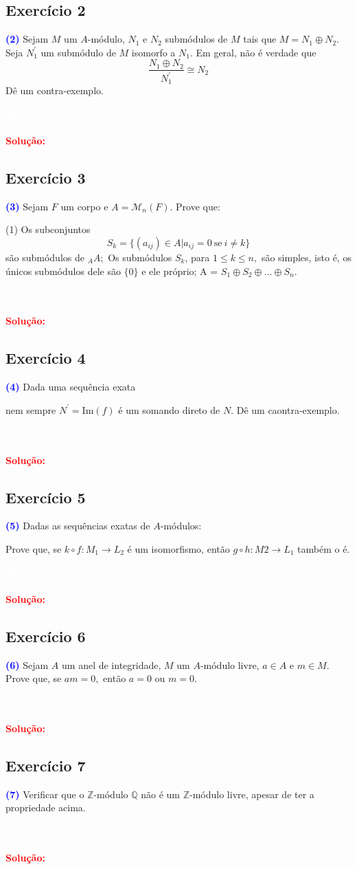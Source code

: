 \documentclass[11pt,a4paper]{article}
\newcommand{\exercicio}[1]{\subsection{Exercício #1} \textcolor{blue}{\bf(#1)}}
\newcommand{\dividiritens}[1]{\begin{tasks}[counter-format={(tsk[a])},label-width=3.6ex, label-format = {\bfseries}, column-sep = {0pt}](1) #1 \end{tasks}}
\newcommand{\pers}[1]{\textcolor{Floresta}{$\negrito{(#1)} $}}
\newcommand{\solucao}[1]{
\textbf{\textcolor{white}{oi}\\ \\ \textcolor{red}{Solução:}} #1}
\begin{document}
\exercicio{2} Sejam $M$ um $A$-módulo, $N_1$ e $N_2$ submódulos de $M$ tais que $M = N_1 \oplus N_2.$ Seja $N^\prime_1$ um submódulo de $M$ isomorfo a $N_1.$ Em geral, não é verdade que
\[
\frac{N_1 \oplus N_2}{N_1^{\prime}} \cong N_2
\]
Dê um contra-exemplo.
\solucao{}

\exercicio{3} Sejam $F$ um corpo e $A = \mathcal{M}_n(F).$ Prove que:
\dividiritens{
\task[\pers{a}] Os subconjuntos
\[
S_k = \{ (a_{ij}) \in A | a_{ij} = 0 \ \mbox{se} \ i \neq k \}
\]
são submódulos de ${}_AA;$
\task[\pers{b}] Os submódulos $S_k$, para $1 \le k \le n,$ são simples, isto é, os únicos submódulos dele são $\{0\}$ e ele próprio;
\task[\pers{c}] A = $S_1 \oplus S_2 \oplus \ldots \oplus S_n.$
}
\solucao{}

\exercicio{4} Dada uma sequência exata
\begin{center}
\end{center}
nem sempre $N^{\prime} = \mbox{Im}(f)$ é um somando direto de $N.$ Dê um caontra-exemplo.
\solucao{}

\exercicio{5} Dadas as sequências exatas de $A$-módulos:
\begin{center}
\end{center}
Prove que, se $k \circ f\colon M_1 \to L_2$ é um isomorfismo, então $g \circ h \colon  M2 \to L_1$ também o é.
\solucao{}

\exercicio{6} Sejam $A$ um anel de integridade, $M$ um $A$-módulo livre, $a \in A$ e $m \in M.$ Prove que, se $am = 0,$
então $a = 0$ ou $m = 0.$
\solucao{}

\exercicio{7} Verificar que o $\mathbb{Z}$-módulo $\mathbb{Q}$ não é um $\mathbb{Z}$-módulo livre, apesar de ter a propriedade acima.
\solucao{}
\end{document}
